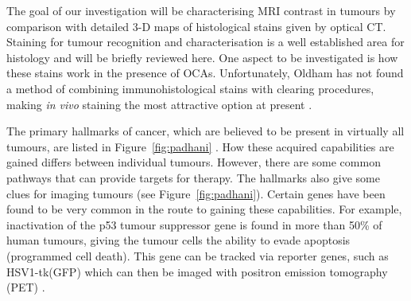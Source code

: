 	The goal of our investigation will be characterising MRI contrast in tumours by comparison with detailed 3-D maps of histological stains given by optical CT. Staining for tumour recognition and characterisation is a well established area for histology and will be briefly reviewed here.  One aspect to be investigated is how these stains work in the presence of OCAs. Unfortunately, Oldham has not found a method of combining immunohistological stains with clearing procedures, making \textit{in vivo} staining the most attractive option at present \cite{Oldham:2008dfa}.
	
	
	
	
	
	
	
	The primary hallmarks of cancer, which are believed to be present in virtually all tumours, are listed in Figure~\ref{fig:padhani} \cite{Hanahan:2000}. How these acquired capabilities are gained differs between individual tumours. However, there are some common pathways that can provide targets for therapy. The hallmarks also give some clues for imaging tumours (see Figure~\ref{fig:padhani}). Certain genes have been found to be very common in the route to gaining these capabilities. For example, inactivation of the p53 tumour suppressor gene is found in more than 50\% of  human tumours, giving the tumour cells the ability to evade apoptosis (programmed cell death). This gene can be tracked via reporter genes, such as HSV1-tk(GFP) which can then be imaged with positron emission tomography (PET) \cite{Doubrovin:2001}.  
	
